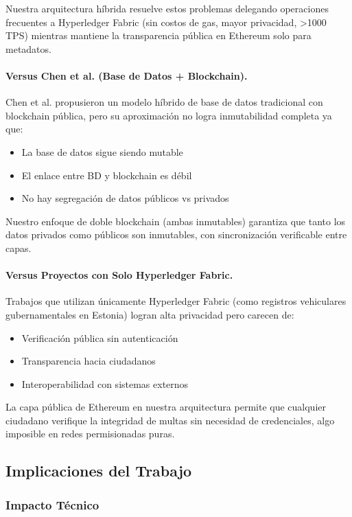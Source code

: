 Nuestra arquitectura híbrida resuelve estos problemas delegando operaciones frecuentes a Hyperledger Fabric (sin costos de gas, mayor privacidad, >1000 TPS) mientras mantiene la transparencia pública en Ethereum solo para metadatos.

\paragraph{Versus Chen et al. (Base de Datos + Blockchain).}
Chen et al. propusieron un modelo híbrido de base de datos tradicional con blockchain pública, pero su aproximación no logra inmutabilidad completa ya que:
\begin{itemize}
    \item La base de datos sigue siendo mutable
    \item El enlace entre BD y blockchain es débil
    \item No hay segregación de datos públicos vs privados
\end{itemize}

Nuestro enfoque de doble blockchain (ambas inmutables) garantiza que tanto los datos privados como públicos son inmutables, con sincronización verificable entre capas.

\paragraph{Versus Proyectos con Solo Hyperledger Fabric.}
Trabajos que utilizan únicamente Hyperledger Fabric (como registros vehiculares gubernamentales en Estonia) logran alta privacidad pero carecen de:
\begin{itemize}
    \item Verificación pública sin autenticación
    \item Transparencia hacia ciudadanos
    \item Interoperabilidad con sistemas externos
\end{itemize}

La capa pública de Ethereum en nuestra arquitectura permite que cualquier ciudadano verifique la integridad de multas sin necesidad de credenciales, algo imposible en redes permisionadas puras.

\subsection{Implicaciones del Trabajo}

\subsubsection{Impacto Técnico}

